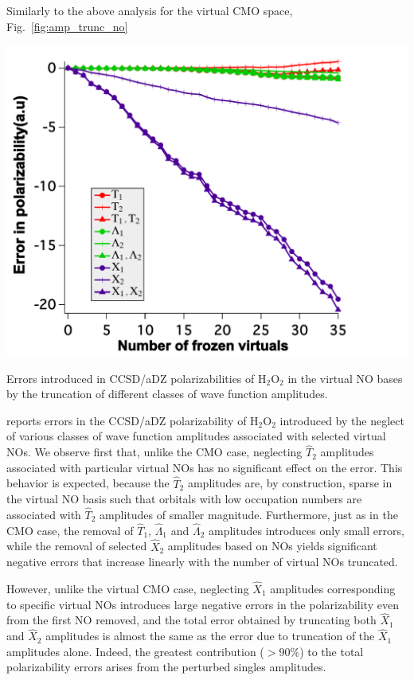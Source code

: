 Similarly to the above analysis for the virtual CMO space,
Fig.~\ref{fig:amp_trunc_no} 
\begin{MyFigure}[h!]
\centering
\includegraphics[width=0.6\linewidth,natwidth=610,natheight=642]{figures_fvno/amp_trunc_no.pdf}
\caption{{\footnotesize Errors introduced in CCSD/aDZ polarizabilities of
H$_2$O$_2$ in the virtual NO bases by the truncation of different classes of wave
function amplitudes.}} 
\label{fig:amp_trunc_no}
\end{MyFigure}
reports errors in the CCSD/aDZ polarizability of
H$_2$O$_2$ introduced by the neglect of various classes of wave function
amplitudes associated with selected virtual NOs.  We observe first that,
unlike the CMO case, neglecting $\hat{T}_2$ amplitudes associated with
particular virtual NOs has no significant effect on the error.  This behavior
is expected, because the $\hat{T}_2$ amplitudes are, by construction, sparse
in the virtual NO basis such that orbitals with low occupation numbers are
associated with $\hat{T}_2$ amplitudes of smaller magnitude.  Furthermore,
just as in the CMO case, the removal of $\hat{T}_1$, $\hat{\Lambda}_1$ and
$\hat{\Lambda}_2$ amplitudes introduces only small errors, while the removal
of selected $\hat{X}_2$ amplitudes based on NOs yields significant negative
errors that increase linearly with the number of virtual NOs truncated.

However, unlike the virtual CMO case, neglecting $\hat{X}_1$ amplitudes
corresponding to specific virtual NOs introduces large negative errors in the
polarizability even from the first NO removed, and the total error obtained by
truncating both $\hat{X}_1$ and $\hat{X}_2$ amplitudes is almost the same as
the error due to truncation of the $\hat{X}_1$ amplitudes alone.  Indeed, 
the greatest contribution ($>90\%$) to the
total polarizability errors arises from the perturbed singles amplitudes.

